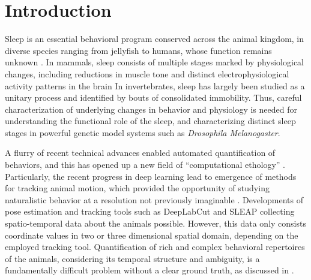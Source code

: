 \setlength{\parindent}{0pt}
\chapter{Introduction}\label{chapter:introduction}
Sleep is an essential behavioral program conserved across the animal kingdom, in diverse species ranging from jellyfish to humans, whose function remains unknown \citep{campbell_animal_1984, nath_jellyfish_2017}.
In mammals, sleep consists of multiple stages marked by physiological changes, including reductions in muscle tone and distinct electrophysiological activity patterns in the brain \citep{corner_sleep_1977, sauer_dynamics_2003} In invertebrates, sleep has largely been studied as a unitary process and identified by bouts of consolidated immobility.
Thus, careful characterization of underlying changes in behavior and physiology is needed for understanding the functional role of the sleep, and characterizing distinct sleep stages in powerful genetic model systems such as \textit{Drosophila Melanogaster}.

A flurry of recent technical advances enabled automated quantification of behaviors, and this has opened up a new field of ``computational ethology'' \citep{anderson_toward_2014, datta_computational_2019}.
Particularly, the recent progress in deep learning lead to emergence of  methods for tracking animal motion, which provided the opportunity of studying naturalistic behavior at a resolution not previously imaginable \citep{pereira_quantifying_2020}.
Developments of pose estimation and tracking tools such as DeepLabCut \citep{mathis_deeplabcut_2018} and SLEAP \citep{pereira_fast_2019, pereira_sleap_2022} collecting spatio-temporal data about the animals possible.
However, this data only consists coordinate values in two or three dimensional spatial domain, depending on the employed tracking tool.
Quantification of rich and complex behavioral repertoires of the animals, considering its temporal structure and ambiguity, is a fundamentally difficult problem without a clear ground truth, as discussed in \citet{pereira_quantifying_2020}.

